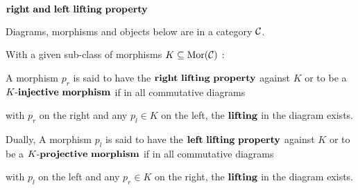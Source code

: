     \begin{defn}
        $\mbf{right\ and\ left\ lifting\ property}$
        \par Diagrams, morphisms and objects below are in a category $\mathcal{C}$.
        \par With a given sub-class of morphisms $K \subseteq \operatorname{\rm{Mor}}(\mathcal{C})$ :
        \\
        \par A morphism $p_r$ is said to have the
        $\mbf{right\ lifting\ property}$ against $K$ or to be
        a $K\mbf{\text{-}injective\ morphism}$
        if in all commutative diagrams
        with $p_r$ on the right and any $p_l \in K$ on the left,
        the $\mathbf{lifting}$ in the diagram exists.
        \\
        \par Dually, A morphism $p_l$ is said to have the
        $\mbf{left\ lifting\ property}$ against $K$ or to be
        a $K\mbf{\text{-}projective\ morphism}$
        if in all commutative diagrams
        with $p_l$ on the left and any $p_r \in K$ on the right,
        the $\mathbf{lifting}$ in the diagram exists.
    \end{defn}


